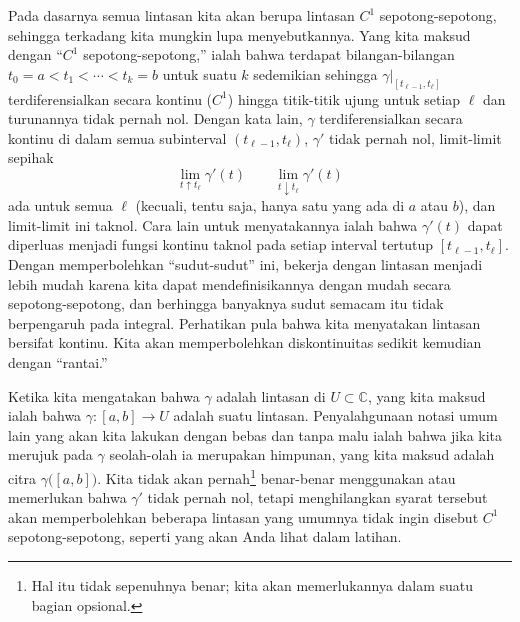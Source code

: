 \documentclass[12pt,openany]{book}
\newcommand{\C}{{\mathbb{C}}}
\newcommand{\myquote}[1]{``#1''}
\theoremstyle{plain}
\theoremstyle{remark}
\theoremstyle{definition}
\theoremstyle{exercise}
\theoremstyle{example}
\begin{document}
Pada dasarnya semua lintasan kita akan berupa lintasan $C^1$ sepotong-sepotong,
sehingga terkadang kita mungkin lupa menyebutkannya.
Yang kita maksud dengan \myquote{$C^1$ sepotong-sepotong,}
ialah bahwa terdapat bilangan-bilangan $t_0 = a < t_1 < \cdots
< t_k = b$ untuk suatu $k$ sedemikian sehingga $\gamma|_{[t_{\ell-1},t_\ell]}$
terdiferensialkan secara kontinu ($C^1$) hingga
titik-titik ujung untuk setiap $\ell$ dan turunannya tidak pernah nol.
Dengan kata lain, $\gamma$ terdiferensialkan secara kontinu di dalam semua
subinterval $(t_{\ell-1},t_\ell)$, $\gamma'$ tidak pernah nol, limit-limit sepihak
\begin{equation*}
\lim_{t \uparrow t_\ell} \gamma'(t) \qquad
\lim_{t \downarrow t_\ell} \gamma'(t)
\end{equation*}
ada untuk semua $\ell$ (kecuali, tentu saja, hanya satu yang ada di $a$ atau $b$),
dan limit-limit ini taknol.
Cara lain untuk menyatakannya ialah bahwa $\gamma'(t)$ dapat diperluas menjadi fungsi kontinu
taknol pada setiap interval tertutup $[t_{\ell-1},t_{\ell}]$.
Dengan memperbolehkan \myquote{sudut-sudut} ini, bekerja dengan lintasan menjadi lebih mudah
karena kita dapat mendefinisikannya dengan mudah secara sepotong-sepotong, dan berhingga banyaknya sudut semacam itu
tidak berpengaruh pada integral.
Perhatikan pula bahwa kita menyatakan lintasan bersifat kontinu.  Kita akan memperbolehkan
diskontinuitas sedikit kemudian dengan \myquote{rantai.}

Ketika kita mengatakan bahwa $\gamma$ adalah lintasan di $U \subset \C$,
yang kita maksud ialah bahwa
$\gamma \colon [a,b] \to U$ adalah suatu lintasan.  Penyalahgunaan notasi umum lain yang
akan kita lakukan dengan bebas dan tanpa malu ialah bahwa jika kita merujuk pada $\gamma$
seolah-olah ia merupakan himpunan, yang kita maksud adalah citra $\gamma\bigl([a,b]\bigr)$.
Kita tidak akan pernah\footnote{Hal itu tidak sepenuhnya benar; kita akan memerlukannya dalam suatu bagian
opsional.} benar-benar menggunakan atau memerlukan bahwa $\gamma'$ tidak pernah nol,
tetapi menghilangkan syarat tersebut akan memperbolehkan beberapa lintasan yang umumnya tidak
ingin disebut $C^1$ sepotong-sepotong,
seperti yang akan Anda lihat dalam latihan.
\end{document}
